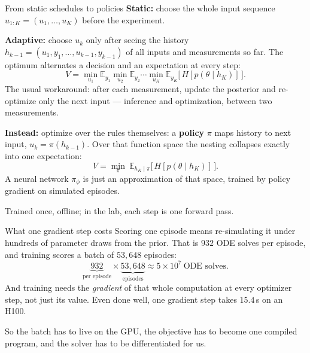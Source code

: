 \documentclass[aspectratio=169]{beamer}
\newcommand{\E}{\mathbb{E}}
\begin{document}
\begin{frame}{From static schedules to policies}
  \small
  \setlength{\abovedisplayskip}{1pt}\setlength{\belowdisplayskip}{1pt}%
  \textbf{Static:} choose the whole input sequence $u_{1:K} = (u_1, \dots, u_K)$ before the experiment.

  \vspace{0.35em}
  \textbf{Adaptive:} choose $u_k$ only after seeing the history
  $h_{k-1} = (u_1, y_1, \dots, u_{k-1}, y_{k-1})$ of all inputs and measurements so far.
  The optimum alternates a decision and an expectation at every step:
  \[
    V = \min_{u_1}\E_{y_1}\min_{u_2}\E_{y_2}\cdots\min_{u_K}\E_{y_K}
        \big[\,H[p(\theta \mid h_K)]\,\big].
  \]
  The usual workaround: after each measurement, update the posterior and re-optimize only the next
  input --- inference and optimization, between two measurements.

  \vspace{0.35em}
  \textbf{Instead:} optimize over the rules themselves: a \textbf{policy} $\pi$ maps history to
  next input, $u_k = \pi(h_{k-1})$. Over that function space the nesting collapses exactly into
  one expectation:
  \[
    V = \min_{\pi}\ \E_{h_K \mid \pi}\big[\,H[p(\theta \mid h_K)]\,\big].
  \]
  A neural network $\pi_\phi$ is just an approximation of that space, trained by policy gradient
  on simulated episodes.

  \vspace{0.35em}
  \alert{Trained once, offline; in the lab, each step is one forward pass.}
\end{frame}

\begin{frame}{What one gradient step costs}
  \small
  \setlength{\abovedisplayskip}{4pt}\setlength{\belowdisplayskip}{4pt}%
  Scoring one episode means re-simulating it under hundreds of parameter draws from the prior.
  That is $932$ ODE solves per episode, and training scores a batch of $53{,}648$ episodes:
  \[
    \underbrace{932}_{\text{per episode}} \times \underbrace{53{,}648}_{\text{episodes}}
    \approx 5 \times 10^{7} \ \text{ODE solves}.
  \]
  And training needs the \emph{gradient} of that whole computation at every optimizer step,
  not just its value. Even done well, one gradient step takes $15.4$\,s on an H100.

  \vspace{0.7em}
  \alert{So the batch has to live on the GPU, the objective has to become one compiled program,
  and the solver has to be differentiated for us.}
\end{frame}
\end{document}
